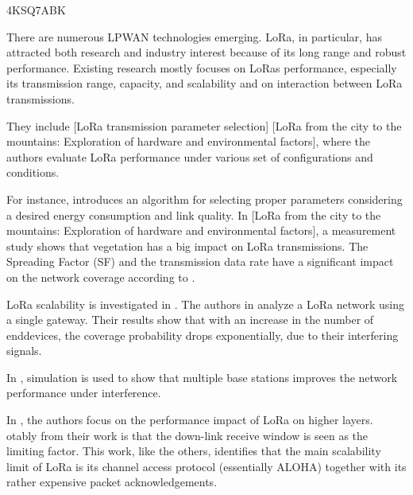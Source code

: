 \cite{orfanidis_investigating_2017} 4KSQ7ABK

There are numerous LPWAN technologies emerging.
LoRa,
	in particular,
	has attracted both research and industry interest because of its long range and robust performance.
Existing research mostly focuses on LoRas performance,
	especially its transmission range,
	capacity,
	and scalability and on interaction between LoRa transmissions.

They include [LoRa transmission parameter selection] \cite{augustin_study_2016} [LoRa from the city to the mountains:
	Exploration of hardware and environmental factors],
	where the authors evaluate LoRa performance under various set of configurations and conditions.

For instance,
	\cite{bor_lora_2017} introduces an algorithm for selecting proper parameters considering a desired energy consumption and link quality.
In [LoRa from the city to the mountains:
	Exploration of hardware and environmental factors],
	a measurement study shows that vegetation has a big impact on LoRa transmissions.
The Spreading Factor (SF) and the transmission data rate have a significant impact on the network coverage according to \cite{augustin_study_2016}.

LoRa scalability is investigated in \cite{georgiou_low_2017}\cite{voigt_mitigating_2016}\cite{adelantado_understanding_2017}.
The authors in \cite{georgiou_low_2017} analyze a LoRa network using a single gateway.
Their results show that with an increase in the number of enddevices,
	the coverage probability drops exponentially,
	due to their interfering signals.

In \cite{voigt_mitigating_2016},
	simulation is used to show that multiple base stations improves the network performance under interference.

In \cite{adelantado_understanding_2017},
	the authors focus on the performance impact of LoRa on higher layers.
otably from their work is that the down-link receive window is seen as the limiting factor.
This work,
	like the others,
	identifies that the main scalability limit of LoRa is its channel access protocol (essentially ALOHA) together with its rather expensive packet acknowledgements.

